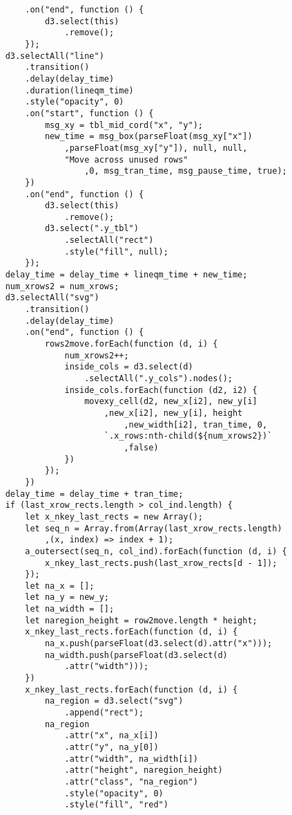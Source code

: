 \begin{lstlisting}
        .on("end", function () {
            d3.select(this)
                .remove();
        });
    d3.selectAll("line")
        .transition()
        .delay(delay_time)
        .duration(lineqm_time)
        .style("opacity", 0)
        .on("start", function () {
            msg_xy = tbl_mid_cord("x", "y");
            new_time = msg_box(parseFloat(msg_xy["x"])
                ,parseFloat(msg_xy["y"]), null, null,
                "Move across unused rows"
                    ,0, msg_tran_time, msg_pause_time, true);
        })
        .on("end", function () {
            d3.select(this)
                .remove();
            d3.select(".y_tbl")
                .selectAll("rect")
                .style("fill", null);
        });
    delay_time = delay_time + lineqm_time + new_time;
    num_xrows2 = num_xrows;
    d3.selectAll("svg")
        .transition()
        .delay(delay_time)
        .on("end", function () {
            rows2move.forEach(function (d, i) {
                num_xrows2++;
                inside_cols = d3.select(d)
                    .selectAll(".y_cols").nodes();
                inside_cols.forEach(function (d2, i2) {
                    movexy_cell(d2, new_x[i2], new_y[i]
                        ,new_x[i2], new_y[i], height
                            ,new_width[i2], tran_time, 0,
                        `.x_rows:nth-child(${num_xrows2})`
                            ,false)
                })
            });
        })
    delay_time = delay_time + tran_time;
    if (last_xrow_rects.length > col_ind.length) {
        let x_nkey_last_rects = new Array();
        let seq_n = Array.from(Array(last_xrow_rects.length)
            ,(x, index) => index + 1);
        a_outersect(seq_n, col_ind).forEach(function (d, i) {
            x_nkey_last_rects.push(last_xrow_rects[d - 1]);
        });
        let na_x = [];
        let na_y = new_y;
        let na_width = [];
        let naregion_height = row2move.length * height;
        x_nkey_last_rects.forEach(function (d, i) {
            na_x.push(parseFloat(d3.select(d).attr("x")));
            na_width.push(parseFloat(d3.select(d)
                .attr("width")));
        })
        x_nkey_last_rects.forEach(function (d, i) {
            na_region = d3.select("svg")
                .append("rect");
            na_region
                .attr("x", na_x[i])
                .attr("y", na_y[0])
                .attr("width", na_width[i])
                .attr("height", naregion_height)
                .attr("class", "na_region")
                .style("opacity", 0)
                .style("fill", "red")

\end{lstlisting}

